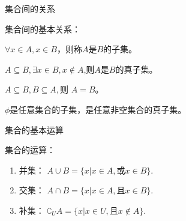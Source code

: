 \documentclass[10pt,
	aspectratio=169,%
	hyperref={colorlinks,
		citecolor=peking_blue,
		urlcolor=peking_blue,
		linkcolor=},
	t,%
	]{beamer}
\theoremstyle{plain}
\begin{document}
\begin{frame}{集合间的关系}

集合间的基本关系：
\begin{description}
	\item<1->[子集：] $\forall x \in A,x \in B$，则称$A$是$B$的子集。
	\item<2->[真子集：] $A\subseteq B, \exists x \in B ,x \notin A$,则$A$是$B$的真子集。
	\item<3->[集合相等：] $A \subseteq B, B \subseteq A,$则 $A = B$。
	\item<4->[空集：] $\phi $是任意集合的子集，是任意非空集合的真子集。
\end{description}

\end{frame}

\begin{frame}{集合的基本运算}
	
	集合的运算：
	\begin{enumerate}
		\item 并集： $A \cup B = \{ x | x \in A,\text{或} x \in B\}$.
		\item 交集： $A \cap B = \{ x | x \in A ,\text{且} x \in B \}$.
		\item 补集： $\complement_UA = \{ x | x \in U, \text{且} x \notin A\}$.
	\end{enumerate}
    
%
%
\end{frame}

%
\end{document}
